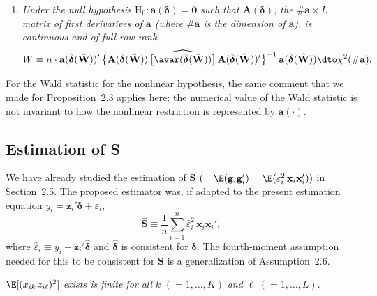 \begin{proposition}
\begin{enumerate}[label=(\alph*)]
\item \emph{Under the null hypothesis $\mathrm{H}_0\colon
  \mathbf{a}(\boldsymbol{\delta}) = \mathbf{0}$ such that $\mathbf{A}(\boldsymbol{\delta})$, the
  $\#\mathbf{a} \times L$ matrix of first derivatives of $\mathbf{a}$ (where $\#\mathbf{a}$ is the dimension
  of $\mathbf{a}$), is continuous and of full row rank,}
  \begin{equation}
    W \equiv n \cdot \mathbf{a}(\hat{\boldsymbol{\delta}}(\hat{\mathbf{W}}))'\,
    \bigl\{\mathbf{A}(\hat{\boldsymbol{\delta}}(\hat{\mathbf{W}}))\,
    \bigl[\widehat{\avar(\hat{\boldsymbol{\delta}}(\hat{\mathbf{W}}))}\bigr]\,
    \mathbf{A}(\hat{\boldsymbol{\delta}}(\hat{\mathbf{W}}))'\bigr\}^{-1}\,
    \mathbf{a}(\hat{\boldsymbol{\delta}}(\hat{\mathbf{W}}))
    \dto \chi^2(\#\mathbf{a}).
    \label{eq:3.5.9}
  \end{equation}
\end{enumerate}
\end{proposition}

For the Wald statistic for the nonlinear hypothesis, the same comment that we
made for Proposition~2.3 applies here: the numerical value of the Wald statistic is
not invariant to how the nonlinear restriction is represented by $\mathbf{a}(\cdot)$.

\subsection*{Estimation of S}

We have already studied the estimation of
$\mathbf{S}$ $(= \E(\mathbf{g}_i \mathbf{g}_i') = \E(\varepsilon_i^2\, \mathbf{x}_i \mathbf{x}_i'))$
in Section~2.5.  The proposed estimator was, if adapted to the present estimation equation
$y_i = \mathbf{z}_i' \boldsymbol{\delta} + \varepsilon_i$,
\begin{equation}
  \hat{\mathbf{S}} \equiv \frac{1}{n} \sum_{i=1}^{n}
  \hat{\varepsilon}_i^2\, \mathbf{x}_i \mathbf{x}_i',
  \label{eq:3.5.10}
\end{equation}
where $\hat{\varepsilon}_i \equiv y_i - \mathbf{z}_i' \hat{\boldsymbol{\delta}}$ and
$\hat{\boldsymbol{\delta}}$ is consistent for $\boldsymbol{\delta}$.  The fourth-moment assumption
needed for this to be consistent for $\mathbf{S}$ is a generalization of Assumption~2.6.

\begin{assumption}
\label{ass:3.6}
$\E[(x_{ik}\, z_{i\ell})^2]$ \emph{exists is finite for all}
$k$ $(= 1, \ldots, K)$ \emph{and} $\ell$ $(= 1, \ldots, L)$.
\end{assumption}

